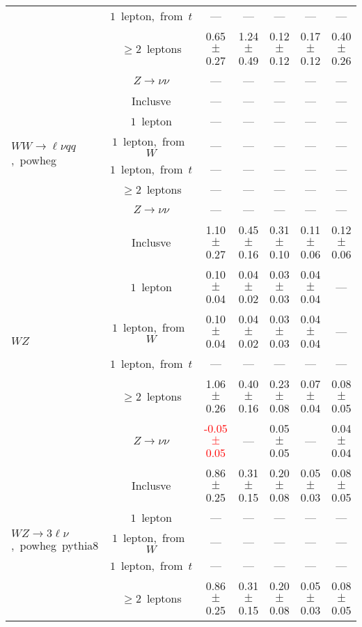 \documentclass{article}
\begin{document}
\begin{longtable}{|l|c|c|c|c|c|c|}
 & $1$~lepton,~from~$t$  & ---  & ---  & ---  & ---  & --- \\* 
 & $\ge2$~leptons  & 0.65 $\pm$ 0.27  & 1.24 $\pm$ 0.49  & 0.12 $\pm$ 0.12  & 0.17 $\pm$ 0.12  & 0.40 $\pm$ 0.26 \\* 
 & $Z\rightarrow\nu\nu$  & ---  & ---  & ---  & ---  & --- \\* 
\hline 
\multirow{6}{*}{$WW{\rightarrow}{\ell}{\nu}qq$,~powheg} & Inclusve  & ---  & ---  & ---  & ---  & --- \\* 
 & $1$~lepton  & ---  & ---  & ---  & ---  & --- \\* 
 & $1$~lepton,~from~$W$  & ---  & ---  & ---  & ---  & --- \\* 
 & $1$~lepton,~from~$t$  & ---  & ---  & ---  & ---  & --- \\* 
 & $\ge2$~leptons  & ---  & ---  & ---  & ---  & --- \\* 
 & $Z\rightarrow\nu\nu$  & ---  & ---  & ---  & ---  & --- \\* 
\hline 
\multirow{6}{*}{$WZ$} & Inclusve  & 1.10 $\pm$ 0.27  & 0.45 $\pm$ 0.16  & 0.31 $\pm$ 0.10  & 0.11 $\pm$ 0.06  & 0.12 $\pm$ 0.06 \\* 
 & $1$~lepton  & 0.10 $\pm$ 0.04  & 0.04 $\pm$ 0.02  & 0.03 $\pm$ 0.03  & 0.04 $\pm$ 0.04  & --- \\* 
 & $1$~lepton,~from~$W$  & 0.10 $\pm$ 0.04  & 0.04 $\pm$ 0.02  & 0.03 $\pm$ 0.03  & 0.04 $\pm$ 0.04  & --- \\* 
 & $1$~lepton,~from~$t$  & ---  & ---  & ---  & ---  & --- \\* 
 & $\ge2$~leptons  & 1.06 $\pm$ 0.26  & 0.40 $\pm$ 0.16  & 0.23 $\pm$ 0.08  & 0.07 $\pm$ 0.04  & 0.08 $\pm$ 0.05 \\* 
 & $Z\rightarrow\nu\nu$  & \textcolor{red}{ -0.05 $\pm$ 0.05 }  & ---  & 0.05 $\pm$ 0.05  & ---  & 0.04 $\pm$ 0.04 \\* 
\hline 
\multirow{6}{*}{$WZ{\rightarrow}3\ell\nu$,~powheg~pythia8} & Inclusve  & 0.86 $\pm$ 0.25  & 0.31 $\pm$ 0.15  & 0.20 $\pm$ 0.08  & 0.05 $\pm$ 0.03  & 0.08 $\pm$ 0.05 \\* 
 & $1$~lepton  & ---  & ---  & ---  & ---  & --- \\* 
 & $1$~lepton,~from~$W$  & ---  & ---  & ---  & ---  & --- \\* 
 & $1$~lepton,~from~$t$  & ---  & ---  & ---  & ---  & --- \\* 
 & $\ge2$~leptons  & 0.86 $\pm$ 0.25  & 0.31 $\pm$ 0.15  & 0.20 $\pm$ 0.08  & 0.05 $\pm$ 0.03  & 0.08 $\pm$ 0.05 \\* 

\end{longtable}
\end{document}
